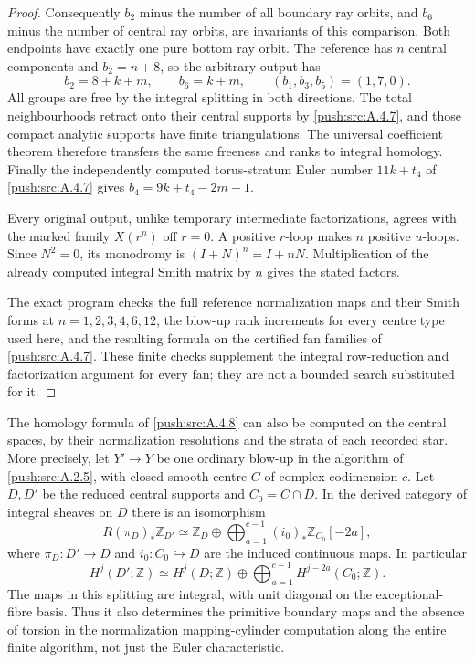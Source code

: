 \begin{proof}
Consequently $b_2$ minus the number of all boundary
ray orbits, and $b_6$ minus the number of central ray
orbits, are invariants of this comparison. Both
endpoints have exactly one pure bottom ray orbit.
The reference has $n$ central components and
$b_2=n+8$, so the arbitrary output has
\[
 b_2=8+k+m,\qquad b_6=k+m,
 \qquad (b_1,b_3,b_5)=(1,7,0).
\]
All groups are free by the integral splitting in both
directions. The total neighbourhoods retract onto
their central supports by \ref{push:src:A.4.7}, and those compact
analytic supports have finite triangulations. The
universal coefficient theorem therefore transfers
the same freeness and ranks to integral homology.
Finally the independently computed torus-stratum
Euler number $11k+t_4$ of \ref{push:src:A.4.7} gives
$b_4=9k+t_4-2m-1$.

Every original output, unlike temporary intermediate
factorizations, agrees with the marked family
$X(r^n)$ off $r=0$. A positive $r$-loop makes $n$
positive $u$-loops. Since $N^2=0$, its monodromy is
$(I+N)^n=I+nN$. Multiplication of the already computed
integral Smith matrix by $n$ gives the stated factors.

The exact program 
checks the full reference normalization maps and their
Smith forms at $n=1,2,3,4,6,12$, the blow-up rank
increments for every centre type used here, and the
resulting formula on the certified fan families of
\ref{push:src:A.4.7}. These finite checks supplement the integral
row-reduction and factorization argument for every
fan; they are not a bounded search substituted for it.
\end{proof}

\begin{proposition}\label{push:src:A.4.9}\label{push:A49}
The homology formula of \ref{push:src:A.4.8} can also be computed
on the central spaces, by their normalization
resolutions and the strata of each recorded star.
More precisely, let $Y'\to Y$ be one ordinary
blow-up in the algorithm of \ref{push:src:A.2.5}, with closed
smooth centre $C$ of complex codimension $c$.
Let $D,D'$ be the reduced central supports and
$C_0=C\cap D$. In the derived category of integral
sheaves on $D$ there is an isomorphism
\[
 R(\pi_D)_*\mathbb Z_{D'}\simeq
 \mathbb Z_D\oplus
 \bigoplus_{a=1}^{c-1}(i_0)_*\mathbb Z_{C_0}[-2a],
 \tag{A.49a}
\]
where $\pi_D:D'\to D$ and $i_0:C_0\hookrightarrow D$
are the induced continuous maps. In particular
\[
 H^j(D';\mathbb Z)\simeq H^j(D;\mathbb Z)
 \oplus\bigoplus_{a=1}^{c-1}H^{j-2a}(C_0;\mathbb Z).
 \tag{A.49b}
\]
The maps in this splitting are integral, with unit
diagonal on the exceptional-fibre basis. Thus it
also determines the primitive boundary maps and
the absence of torsion in the normalization
mapping-cylinder computation along the entire
finite algorithm, not just the Euler characteristic.
\end{proposition}

